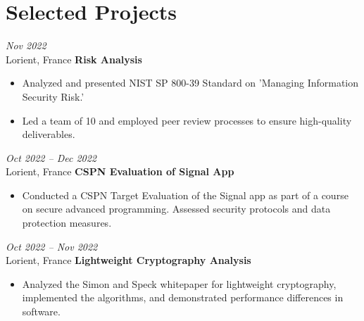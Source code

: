 \section{Selected Projects}

\begin{twocolentry}{
    \textit{Nov 2022}\\
    \small Lorient, France}
    \normalsize \textbf{Risk Analysis}
    \small
    \begin{itemize}
        \item Analyzed and presented NIST SP 800-39 Standard on 'Managing Information Security Risk.'
        \item Led a team of 10 and employed peer review processes to ensure high-quality deliverables.
    \end{itemize}    
\end{twocolentry}

\vspace{\betweenentryspace}

\begin{twocolentry}{
    \textit{Oct 2022 – Dec 2022}\\
    \small Lorient, France}
    \normalsize \textbf{CSPN Evaluation of Signal App}
    \small
    \begin{itemize}
        \item Conducted a CSPN Target Evaluation of the Signal app as part of a course on secure advanced programming. Assessed security protocols and data protection measures.
    \end{itemize}
\end{twocolentry}


\vspace{\betweenentryspace}

\begin{twocolentry}{
    \textit{Oct 2022 – Nov 2022}\\
    \small Lorient, France}
    \normalsize \textbf{Lightweight Cryptography Analysis}
    \small
    \begin{itemize}
        \item Analyzed the Simon and Speck whitepaper for lightweight cryptography, implemented the algorithms, and demonstrated performance differences in software.
    \end{itemize}
\end{twocolentry}
